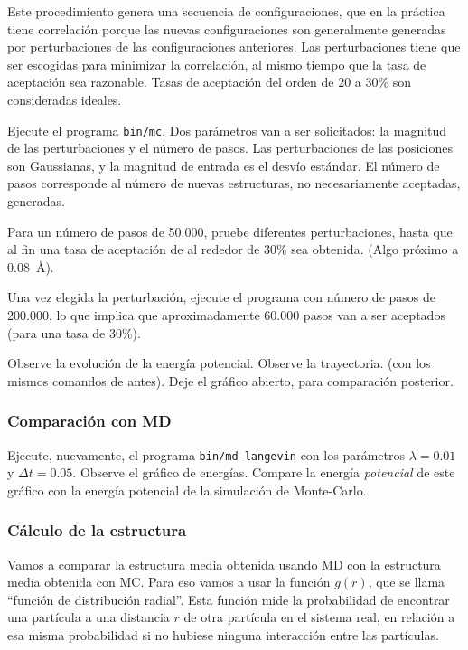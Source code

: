 \documentclass[10pt,a4paper,ssfamily]{exam}
\newcommand{\1}{{\bf 1}}
\newcommand{\2}{{\bf 2}}
\newcommand{\3}{{\bf 3}}
\begin{document}
Este procedimiento genera una secuencia de configuraciones, que en la
práctica tiene correlación porque las nuevas configuraciones son
generalmente generadas por perturbaciones de las configuraciones
anteriores. Las perturbaciones tiene que ser escogidas para minimizar la
correlación, al mismo tiempo que la tasa de aceptación sea razonable.
Tasas de aceptación del orden de 20 a 30\% son consideradas ideales. 

Ejecute el programa {\tt bin/mc}. Dos parámetros van a ser solicitados:
la magnitud de las perturbaciones y el número de pasos. Las
perturbaciones de las posiciones son Gaussianas, y la magnitud de
entrada es el desvío estándar. El número de pasos corresponde al número
de nuevas estructuras, no necesariamente aceptadas, generadas.  

Para un número de pasos de 50.000, pruebe diferentes perturbaciones,
hasta que al fin una tasa de aceptación de al rededor de 30\% sea
obtenida. (Algo próximo a $0.08$~\AA). 

Una vez elegida la perturbación, ejecute el programa con número de pasos
de 200.000, lo que implica que aproximadamente 60.000 pasos van a ser
aceptados (para una tasa de 30\%). 

Observe la evolución de la energía potencial. Observe la trayectoria. 
(con los mismos comandos de antes). Deje el gráfico abierto, para
comparación posterior. 

\subsubsection{Comparación con MD}

Ejecute, nuevamente, el programa {\tt bin/md-langevin} con los
parámetros $\lambda=0.01$ y $\Delta t=0.05$. Observe el gráfico
de energías. Compare la energía {\it potencial} de este gráfico con la
energía potencial de la simulación de Monte-Carlo.

\subsubsection{Cálculo de la estructura}

Vamos a comparar la estructura media obtenida usando MD con la
estructura media obtenida con MC. Para eso vamos a usar la función
$g(r)$, que se llama ``función de distribución radial''. 
Esta función mide la probabilidad de encontrar una partícula a
una distancia $r$ de otra partícula en el sistema real, en relación a
esa misma probabilidad si no hubiese ninguna interacción entre las
partículas. 
\end{document}
